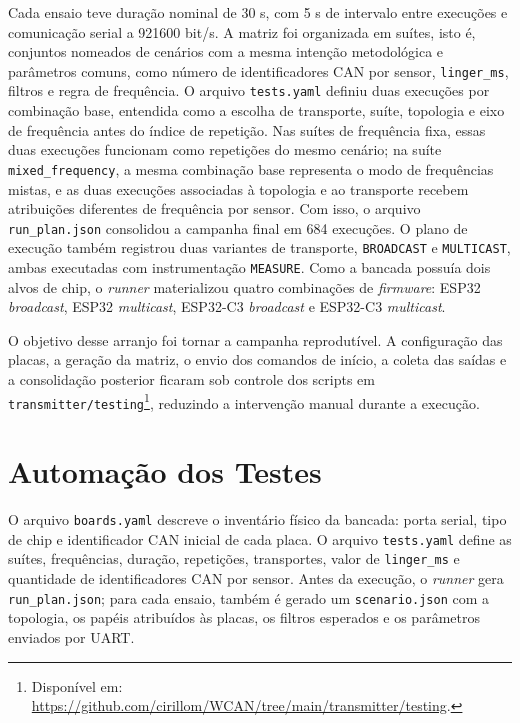 Cada ensaio teve duração nominal de 30 s, com 5 s de intervalo entre execuções e comunicação serial a 921600 bit/s. A matriz foi organizada em suítes, isto é, conjuntos nomeados de cenários com a mesma intenção metodológica e parâmetros comuns, como número de identificadores CAN por sensor, \texttt{linger\_ms}, filtros e regra de frequência. O arquivo \texttt{tests.yaml} definiu duas execuções por combinação base, entendida como a escolha de transporte, suíte, topologia e eixo de frequência antes do índice de repetição. Nas suítes de frequência fixa, essas duas execuções funcionam como repetições do mesmo cenário; na suíte \texttt{mixed\_frequency}, a mesma combinação base representa o modo de frequências mistas, e as duas execuções associadas à topologia e ao transporte recebem atribuições diferentes de frequência por sensor. Com isso, o arquivo \texttt{run\_plan.json} consolidou a campanha final em 684 execuções. O plano de execução também registrou duas variantes de transporte, \texttt{BROADCAST} e \texttt{MULTICAST}, ambas executadas com instrumentação \texttt{MEASURE}. Como a bancada possuía dois alvos de chip, o \emph{runner} materializou quatro combinações de \emph{firmware}: ESP32 \emph{broadcast}, ESP32 \emph{multicast}, ESP32-C3 \emph{broadcast} e ESP32-C3 \emph{multicast}.

O objetivo desse arranjo foi tornar a campanha reprodutível. A configuração das placas, a geração da matriz, o envio dos comandos de início, a coleta das saídas e a consolidação posterior ficaram sob controle dos scripts em \texttt{transmitter/testing}\footnote{Disponível em: \url{https://github.com/cirillom/WCAN/tree/main/transmitter/testing}.}, reduzindo a intervenção manual durante a execução.

\section{Automação dos Testes}

O arquivo \texttt{boards.yaml} descreve o inventário físico da bancada: porta serial, tipo de chip e identificador CAN inicial de cada placa. O arquivo \texttt{tests.yaml} define as suítes, frequências, duração, repetições, transportes, valor de \texttt{linger\_ms} e quantidade de identificadores CAN por sensor. Antes da execução, o \emph{runner} gera \texttt{run\_plan.json}; para cada ensaio, também é gerado um \texttt{scenario.json} com a topologia, os papéis atribuídos às placas, os filtros esperados e os parâmetros enviados por UART.

